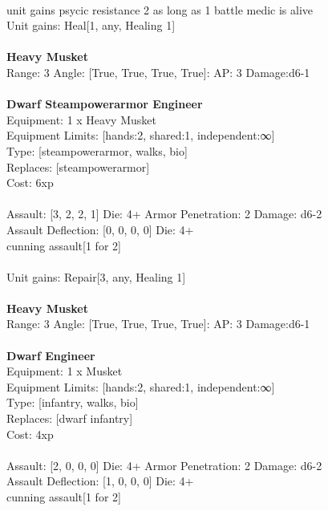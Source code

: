 \ \\
unit gains psycic resistance 2 as long as 1 battle medic is alive\\ 
Unit gains: Heal[1, any, Healing 1]\\ 

\ \\
{\bf Heavy Musket } \\



Range: 3  Angle: [True, True, True, True]: AP: 3 Damage:d6-1 \\




 
\ \\

{\bf Dwarf Steampowerarmor Engineer } \\
Equipment: 1 x Heavy Musket \\
Equipment Limits: [hands:2, shared:1, independent:∞] \\
Type: [steampowerarmor, walks, bio] \\
Replaces: [steampowerarmor] \\
Cost: 6xp\\
\ \\
Assault: [3, 2, 2, 1] Die: 4+ Armor Penetration: 2 Damage: d6-2 \\
Assault Deflection: [0, 0, 0, 0] Die: 4+\\
\indent cunning assault[1 for 2]\\ 
 
\ \\
Unit gains: Repair[3, any, Healing 1]\\ 

\ \\
{\bf Heavy Musket } \\



Range: 3  Angle: [True, True, True, True]: AP: 3 Damage:d6-1 \\




 
\ \\

{\bf Dwarf Engineer } \\
Equipment: 1 x Musket \\
Equipment Limits: [hands:2, shared:1, independent:∞] \\
Type: [infantry, walks, bio] \\
Replaces: [dwarf infantry] \\
Cost: 4xp\\
\ \\
Assault: [2, 0, 0, 0] Die: 4+ Armor Penetration: 2 Damage: d6-2 \\
Assault Deflection: [1, 0, 0, 0] Die: 4+\\
\indent cunning assault[1 for 2]\\ 
 
